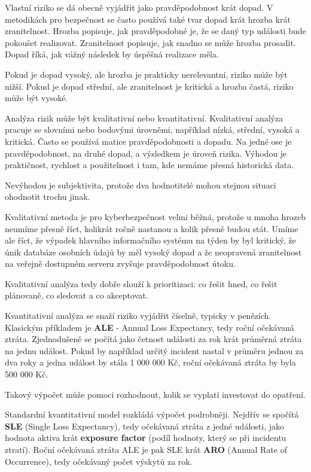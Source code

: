 Vlastní riziko se dá obecně vyjádřit jako pravděpodobnost krát dopad. V metodikách pro bezpečnost se často používá také tvar dopad krát hrozba krát zranitelnost. Hrozba popisuje, jak pravděpodobné je, že se daný typ události bude pokoušet realizovat. Zranitelnost popisuje, jak snadno se může hrozba prosadit. Dopad říká, jak vážný následek by úspěšná realizace měla.

Pokud je dopad vysoký, ale hrozba je prakticky nerelevantní, riziko může být nižší. Pokud je dopad střední, ale zranitelnost je kritická a hrozba častá, riziko může být vysoké.

Analýza rizik může být kvalitativní nebo kvantitativní. Kvalitativní analýza pracuje se slovními nebo bodovými úrovněmi, například nízká, střední, vysoká a kritická. Často se používá matice pravděpodobnosti a dopadu. Na jedné ose je pravděpodobnost, na druhé dopad, a výsledkem je úroveň rizika. Výhodou je praktičnost, rychlost a použitelnost i tam, kde nemáme přesná historická data.

Nevýhodou je subjektivita, protože dva hodnotitelé mohou stejnou situaci ohodnotit trochu jinak.

Kvalitativní metoda je pro kyberbezpečnost velmi běžná, protože u mnoha hrozeb neumíme přesně říct, kolikrát ročně nastanou a kolik přesně budou stát. Umíme ale říct, že výpadek hlavního informačního systému na týden by byl kritický, že únik databáze osobních údajů by měl vysoký dopad a že neopravená zranitelnost na veřejně dostupném serveru zvyšuje pravděpodobnost útoku.

Kvalitativní analýza tedy dobře slouží k prioritizaci: co řešit hned, co řešit plánovaně, co sledovat a co akceptovat.

Kvantitativní analýza se snaží riziko vyjádřit číselně, typicky v penězích. Klasickým příkladem je \textbf{ALE} - Annual Loss Expectancy, tedy roční očekávaná ztráta. Zjednodušeně se počítá jako četnost události za rok krát průměrná ztráta na jednu událost. Pokud by například určitý incident nastal v průměru jednou za dva roky a jedna událost by stála 1 000 000 Kč, roční očekávaná ztráta by byla 500 000 Kč.

Takový výpočet může pomoci rozhodnout, kolik se vyplatí investovat do opatření.

Standardní kvantitativní model rozkládá výpočet podrobněji. Nejdřív se spočítá \textbf{SLE} (Single Loss Expectancy), tedy očekávaná ztráta z jedné události, jako hodnota aktiva krát \textbf{exposure factor} (podíl hodnoty, který se při incidentu ztratí). Roční očekávaná ztráta ALE je pak SLE krát \textbf{ARO} (Annual Rate of Occurrence), tedy očekávaný počet výskytů za rok.

